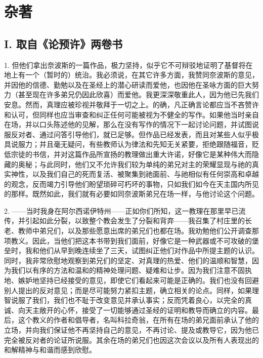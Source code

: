 
\chapter{杂著}



\section{I. 取自《论预许》两卷书}

1. 但他们拿出奈波斯的一篇作品，极力坚持，似乎它不可辩驳地证明了基督将在地上有一个（暂时的）统治。我必须说，在其它许多方面，我赞同奈波斯的意见，并因他的信德、勤勉以及在圣经上的潜心研读而爱他，也因他在圣咏方面的巨大努力（甚至现在许多弟兄仍因此欣喜）而爱他。我更深深敬重此人，因为他已先我们安息。然而，真理应被珍视并敬拜于一切之上。的确，凡正确言论都应当不吝赞许和认可，但同样也应当审查和纠正任何可能被视为不健全的写作。如果他当时亲自在场，并以口头陈述他的见解，那么在没有写作的情况下一起讨论问题，并试图说服反对者、通过问答引导他们，就已足够。但作品已经发表，而且对某些人似乎极具说服力；并且毫无疑问，有些教师认为律法和先知无关紧要，拒绝跟随福音，贬低宗徒的书信，并对这篇作品所宣扬的教理做出重大许诺，好像它是某种伟大而隐藏的奥秘；与此同时，他们又不允许我们较为单纯的弟兄对主的荣耀显现与祂的真实神性，以及我们自己的死而复活、被聚集到祂面前、与祂相似有任何崇高和卓越的观念，反而竭力引导他们盼望琐碎可朽坏的事物，只如我们如今在天主国内所见的那样。既然如此，我们就有必要如同奈波斯弟兄在场一样，与他讨论这个问题。\par

2. ——当时我身在阿尔西诺伊特州——正如你们所知，这一教理在那里早已流传，并引起如此分裂，以致整个教会发生了分裂和背弃——我召集了村庄里的长老、教师中弟兄们，以及那些愿意出席的弟兄们也都在场。我劝勉他们公开调查那项教义。因此，当他们把这本书带到我们面前，好像它是一种武器或不可攻破的堡垒时，我和他们从早到晚连续坐了三天，试图纠正他们对作品中所提主题的认识。同时，我非常欣慰地观察到弟兄们的坚定、对真理的热爱、他们的温顺和智慧，因为我们以有序的方法和温和的精神处理问题、疑难和让步。因为我们注意不固执地、嫉妒地坚持已经接受的意见，即使它们看起来可能是正确的。我们也没有回避别人提出的反对意见；而是尽可能努力紧扣主题，确立相关的论点。同样，如果理智说服了我们，我们也不耻于改变意见并承认事实；反而凭着良心，以完全的真诚、向天主敞开的心怀，接受了一切能够通过圣经的证明和教导而确立的内容。最后，这个教义的作者和倡导者，名叫科拉奇翁，在所有在场的弟兄面前承认了他的立场，并向我们保证他不再坚持自己的意见，不再讨论、提及或教导它，因为他已完全被反对者的论证所说服。其余在场的弟兄们也因这次会议以及所有人表现出的和解精神与和谐而感到欣慰。\par

